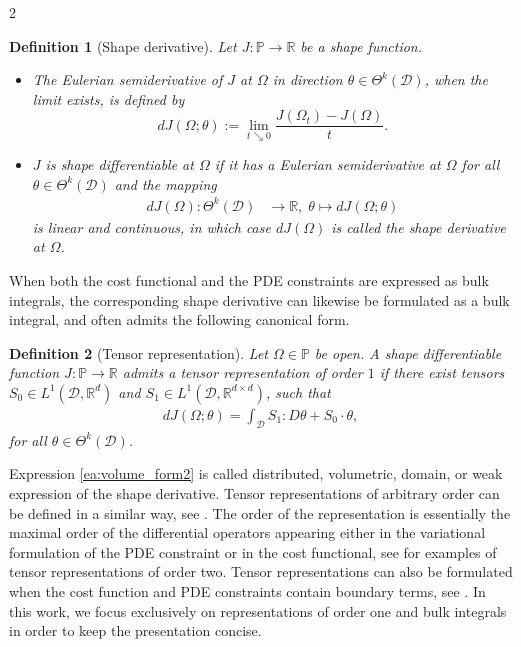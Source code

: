 \documentclass[a4paper, oneside]{article}
\newcommand{\hold}{\mathcal{D}}
\newcommand{\Sb}{S}
\newcommand{\Om}{\Omega}
\newcommand{\VV}{\theta}
\newcommand{\R}{\mathds{R}}
\newcommand{\ddo}{:}
\newtheorem{definition}{Definition}
\begin{document}
\begin{multicols}{2}
\begin{definition}[Shape derivative]\label{def1}
	Let $J : \mathds{P} \rightarrow \R$ be a shape function.
	\begin{itemize}
	\item[(i)] The Eulerian semiderivative of $J$ at $\Omega$ in direction $\theta \in \Theta^k(\hold)$, when the limit exists,
	is defined by
	\begin{equation}
	dJ(\Omega ;\VV):= \lim_{t \searrow 0}\frac{J(\Omega_t)-J(\Omega)}{t}.
	\end{equation}
	\item[(ii)] $J$ is  \textit{shape differentiable} at $\Omega$ if it has a Eulerian semiderivative at $\Omega$ for all $\theta \in \Theta^k(\hold)$ and the mapping
	\begin{align*}
	dJ(\Omega): \Theta^k(\hold) &  \to \R,\; \VV     \mapsto dJ(\Omega ;\VV)
	\end{align*}
	is linear and continuous, in which case $dJ(\Omega)$ is called the \textit{shape derivative} at $\Omega$.
	\end{itemize}
\end{definition}
	When both the cost functional and the PDE constraints are expressed as bulk integrals, the corresponding shape derivative can likewise be formulated as a bulk integral, and often admits the following canonical form.
\begin{definition}[Tensor representation]\label{def:tensor2}
	Let $\Om\in \mathds{P}$ be open.
	A shape differentiable function $J : \mathds{P} \rightarrow \R$  admits  a tensor representation of order $1$ if
	there exist tensors $\Sb_0\in L^1(\hold,\R^{d})$  and $\Sb_1\in L^1(\hold,\R^{d\times d})$, such that
	\begin{align}
	\label{ea:volume_form2}
	dJ(\Omega ;\VV) = \int_\hold \Sb_1 \ddo D\VV +  \Sb_0\cdot \VV,
	\end{align}
	for all  $\VV\in \Theta^k(\hold)$. 
\end{definition}
	Expression \eqref{ea:volume_form2} is called distributed, volumetric, domain, or weak expression of the shape derivative.
	Tensor representations of arbitrary order can be defined in a similar way, see \cite{MR3535238}.
The order of the representation is essentially the maximal order of the differential operators appearing either in the variational formulation of the PDE constraint or in the cost functional, see \cite{MR4531392,LL2024} for examples of tensor representations of order two. 
Tensor representations can also be formulated when the cost function and PDE constraints contain boundary terms, see \cite{MR3535238}.
In this work, we focus exclusively on representations of order one and bulk integrals in order to keep the presentation concise.


\end{multicols}
\end{document}
